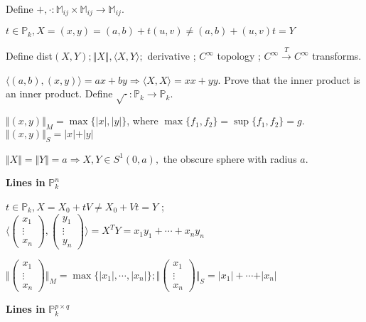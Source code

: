 \documentclass[10pt,a4paper]{article}
\begin{document}
Define $+, \cdot : \mathbb{M}_{ij} \times \mathbb{M}_{ij} \rightarrow \mathbb{M}_{ij} $.

$t \in \mathbb{P}_k, X = (x,y) = (a,b) + t (u,v) \neq (a,b) + (u, v) t = Y$

Define dist$(X, Y) ; \Vert X \Vert, \langle X, Y \rangle ; $ derivative ; $C^\infty$ topology ; $C^\infty \stackrel{T}{\rightarrow} C^\infty $ transforms.

$\langle (a,b), (x,y) \rangle = ax + by \Rightarrow \langle X, X \rangle = xx + yy$. Prove that the inner product is an inner product. Define $\sqrt{\cdot} : \mathbb{P}_k \rightarrow \mathbb{P}_k$.

$\Vert (x,y) \Vert_M = \max \{ \vert x \vert, \vert y \vert \}$, where $\max \{ f_1, f_2 \} = \sup \{ f_1, f_2 \} = g$. $\Vert (x,y) \Vert_S =  \vert x \vert + \vert y \vert$

$\Vert X \Vert = \Vert Y \Vert = a \Rightarrow X, Y \in S^1(0, a),$ the obscure sphere with radius $a$.
 
\vspace{3mm}

\textbf{Lines in }$\mathbb{P}_k^n$

$t \in \mathbb{P}_k, X = X_0 + t V \neq X_0 + V t = Y$ ; $\biggl\langle \begin{pmatrix} x_1 \\ \vdots \\ x_n \end{pmatrix}, \begin{pmatrix} y_1 \\ \vdots \\ y_n \end{pmatrix} \biggl\rangle = X^T Y = x_1 y_1 + \cdots + x_n y_n$

$\biggl\Vert \begin{pmatrix} x_1 \\ \vdots \\ x_n \end{pmatrix} \biggl\Vert_M = \max \{ \vert x_1 \vert, \cdots, \vert x_n \vert \} ; \biggl\Vert \begin{pmatrix} x_1 \\ \vdots \\ x_n \end{pmatrix} \biggl\Vert_S = \vert x_1 \vert + \cdots + \vert x_n \vert $

\vspace{3mm}

\textbf{Lines in }$\mathbb{P}_k^{p \times q}$
\end{document}
